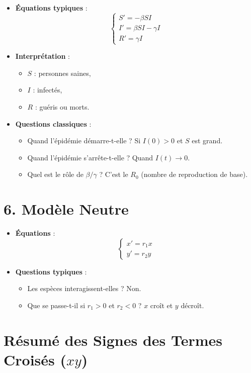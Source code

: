 \documentclass{article}
\begin{document}
\begin{itemize}
  \item \textbf{Équations typiques} :
  \[
  \begin{cases}
  S' = -\beta SI \\
  I' = \beta SI - \gamma I \\
  R' = \gamma I
  \end{cases}
  \]
  \item \textbf{Interprétation} :
  \begin{itemize}
    \item $S$ : personnes saines,
    \item $I$ : infectés,
    \item $R$ : guéris ou morts.
  \end{itemize}
  \item \textbf{Questions classiques} :
  \begin{itemize}
    \item Quand l’épidémie démarre-t-elle ? Si $I(0) > 0$ et $S$ est grand.
    \item Quand l’épidémie s’arrête-t-elle ? Quand $I(t) \rightarrow 0$.
    \item Quel est le rôle de $\beta/\gamma$ ? C’est le $R_0$ (nombre de reproduction de base).
  \end{itemize}
\end{itemize}

\section*{6. Modèle Neutre}

\begin{itemize}
  \item \textbf{Équations} :
  \[
  \begin{cases}
  x' = r_1 x \\
  y' = r_2 y
  \end{cases}
  \]
  \item \textbf{Questions typiques} :
  \begin{itemize}
    \item Les espèces interagissent-elles ? Non.
    \item Que se passe-t-il si $r_1 > 0$ et $r_2 < 0$ ? $x$ croît et $y$ décroît.
  \end{itemize}
\end{itemize}

\section*{Résumé des Signes des Termes Croisés (\(xy\))}
\end{document}

